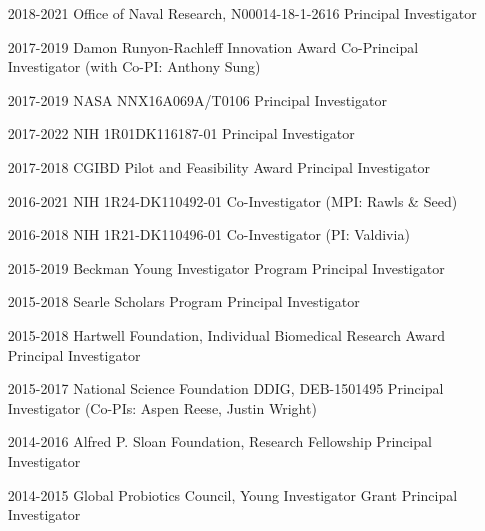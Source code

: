 \documentclass[overlapped,line,11pt]{res}
\begin{document}
\begin{resume}
\begin{itemize}[leftmargin=2cm, style=sameline]
\item[2018-2021] Office of Naval Research, N00014-18-1-2616
  \newline Principal Investigator

\item[2017-2019] Damon Runyon-Rachleff Innovation Award 
  \newline Co-Principal Investigator (with Co-PI:
  Anthony Sung)

\item[2017-2019] NASA NNX16A069A/T0106 \newline Principal Investigator


\item[2017-2022] NIH 1R01DK116187-01 \newline
  Principal Investigator

\item[2017-2018] CGIBD Pilot and Feasibility Award \newline Principal
  Investigator


\item[2016-2021] NIH 1R24-DK110492-01  \newline
  Co-Investigator (MPI: Rawls \& Seed)

\item[2016-2018] NIH 1R21-DK110496-01 \newline Co-Investigator (PI: Valdivia)

\item[2015-2019] Beckman Young Investigator Program
   \newline Principal Investigator

\item[2015-2018] Searle Scholars Program  \newline Principal Investigator 
  
\item[2015-2018] Hartwell Foundation, Individual Biomedical Research Award \newline Principal Investigator 


\item[2015-2017] National Science Foundation DDIG, DEB-1501495 \newline Principal Investigator (Co-PIs: Aspen Reese, Justin Wright) 


\item[2014-2016] Alfred P. Sloan Foundation, Research Fellowship \newline Principal Investigator 

\item[2014-2015] Global Probiotics Council, Young Investigator Grant  \newline Principal Investigator 


\end{itemize}
\end{resume}
\end{document}

